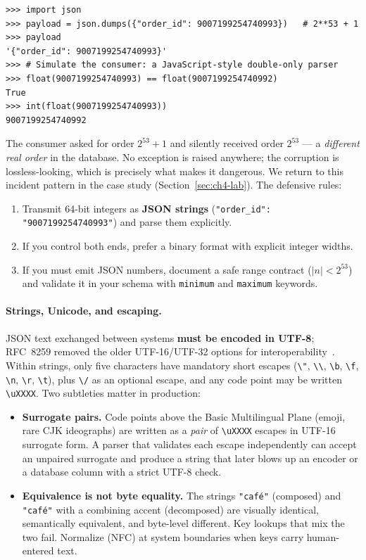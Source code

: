 \begin{verbatim}
>>> import json
>>> payload = json.dumps({"order_id": 9007199254740993})   # 2**53 + 1
>>> payload
'{"order_id": 9007199254740993}'
>>> # Simulate the consumer: a JavaScript-style double-only parser
>>> float(9007199254740993) == float(9007199254740992)
True
>>> int(float(9007199254740993))
9007199254740992
\end{verbatim}

The consumer asked for order $2^{53}+1$ and silently received order $2^{53}$ --- a
\emph{different real order} in the database. No exception is raised anywhere; the
corruption is lossless-looking, which is precisely what makes it dangerous. We return
to this incident pattern in the case study (Section~\ref{sec:ch4-lab}). The defensive
rules:

\begin{enumerate}
  \item Transmit 64-bit integers as \textbf{JSON strings}
        (\texttt{"order\_id": "9007199254740993"}) and parse them explicitly.
  \item If you control both ends, prefer a binary format with explicit integer widths.
  \item If you must emit JSON numbers, document a safe range contract
        ($|n| < 2^{53}$) and validate it in your schema with \texttt{minimum} and
        \texttt{maximum} keywords.
\end{enumerate}

\paragraph{Strings, Unicode, and escaping.}
JSON text exchanged between systems \textbf{must be encoded in UTF-8}; RFC~8259
removed the older UTF-16/UTF-32 options for interoperability~\cite{rfc8259}. Within
strings, only five characters have mandatory short escapes
(\texttt{\textbackslash"}, \texttt{\textbackslash\textbackslash},
\texttt{\textbackslash b}, \texttt{\textbackslash f}, \texttt{\textbackslash n},
\texttt{\textbackslash r}, \texttt{\textbackslash t}), plus
\texttt{\textbackslash/} as an optional escape, and any code point may be written
\texttt{\textbackslash uXXXX}. Two subtleties matter in production:

\begin{itemize}
  \item \textbf{Surrogate pairs.} Code points above the Basic Multilingual Plane
        (emoji, rare CJK ideographs) are written as a \emph{pair} of
        \texttt{\textbackslash uXXXX} escapes in UTF-16 surrogate form. A parser that
        validates each escape independently can accept an unpaired surrogate and
        produce a string that later blows up an encoder or a database column with a
        strict UTF-8 check.
  \item \textbf{Equivalence is not byte equality.} The strings
        \texttt{"caf\'e"} (composed) and \texttt{"caf\'e"} with a combining accent
        (decomposed) are visually identical, semantically equivalent, and byte-level
        different. Key lookups that mix the two fail. Normalize (NFC) at system
        boundaries when keys carry human-entered text.
\end{itemize}

